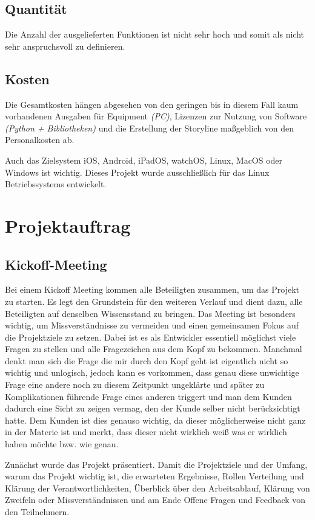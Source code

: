 \documentclass[a4paper,12pt]{article}
\begin{document}
\subsection{Quantität}
Die Anzahl der ausgelieferten Funktionen ist nicht sehr hoch und somit als nicht sehr anspruchsvoll zu definieren.
\subsection{Kosten}
Die Gesamtkosten hängen abgesehen von den geringen bis in diesem Fall kaum vorhandenen Ausgaben für Equipment \textit{(PC)}, Lizenzen zur Nutzung von Software \textit{(Python + Bibliotheken)} und die Erstellung der Storyline maßgeblich von den Personalkosten ab. \par\vspace{0.5em} Auch das Zielsystem iOS, Android, iPadOS, watchOS, Linux, MacOS oder Windows ist wichtig. Dieses Projekt wurde ausschließlich für das Linux Betriebssystems entwickelt.
\clearpage
\section{Projektauftrag}
\subsection{Kickoff-Meeting}
Bei einem Kickoff Meeting kommen alle Beteiligten zusammen, um das Projekt zu starten. Es legt den Grundstein für den weiteren Verlauf und dient dazu, alle Beteiligten auf denselben Wissensstand zu bringen. Das Meeting ist besonders wichtig, um Missverständnisse zu vermeiden und einen gemeinsamen Fokus auf die Projektziele zu setzen. Dabei ist es als Entwickler essentiell möglichst viele Fragen zu stellen und alle Fragezeichen aus dem Kopf zu bekommen. Manchmal denkt man sich die Frage die mir durch den Kopf geht ist eigentlich nicht so wichtig und unlogisch, jedoch kann es vorkommen, dass genau diese unwichtige Frage eine andere noch zu diesem Zeitpunkt ungeklärte und später zu Komplikationen führende Frage eines anderen triggert und man dem Kunden dadurch eine Sicht zu zeigen vermag, den der Kunde selber nicht berücksichtigt hatte. Dem Kunden ist dies genauso wichtig, da dieser möglicherweise nicht ganz in der Materie ist und merkt, dass dieser nicht wirklich weiß was er wirklich haben möchte bzw. wie genau. \par\vspace{0.5em} Zunächst wurde das Projekt präsentiert. Damit die Projektziele und der Umfang, warum das Projekt wichtig ist, die erwarteten Ergebnisse, Rollen Verteilung und Klärung der Verantwortlichkeiten, Überblick über den Arbeitsablauf, Klärung von Zweifeln oder Missverständnissen und am Ende Offene Fragen und Feedback von den Teilnehmern.
\end{document}

